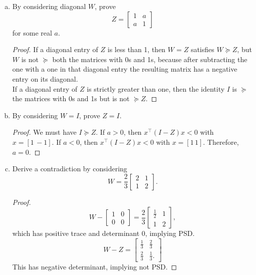\documentclass[../borwein-lewis_notes.tex]{subfiles}
\begin{document}
\begin{enumerate}[(a)]
\item By considering diagonal $W$, prove 
\begin{equation*}
Z = \begin{bmatrix} 1 & a \\ a & 1 \end{bmatrix}
\end{equation*}
for some real $a$. 
\begin{proof}
If a diagonal entry of $Z$ is less than 1, then $W = Z$ satisfies 
$W\succeq Z$, but $W$ is not $\succeq$ both the matrices with 0s and 
1s, because after subtracting the one with a one in that diagonal 
entry the resulting matrix has a negative entry on its diagonal. \\
If a diagonal entry of $Z$ is strictly greater than one, then the 
identity $I$ is $\succeq$ the matrices with 0s and 1s but is not 
$\succeq Z$.
\end{proof}
\item By considering $W=I$, prove $Z=I$.
\begin{proof}
We must have $I\succeq Z$. If $a>0$, then $x^\top (I- Z) x < 0$ with 
$x=[1\, -1]$. If $a<0$, then $x^\top (I-Z) x < 0$ with $x=[1\, 1]$.
Therefore, $a=0$.
\end{proof}
\item Derive a contradiction by considering 
\begin{equation*}
W = \frac{2}{3}\begin{bmatrix} 2&1\\1&2\end{bmatrix}.
\end{equation*}
\begin{proof}
\begin{equation*}
W - \begin{bmatrix} 1 & 0 \\ 0 & 0 \end{bmatrix}
= \frac{2}{3}\begin{bmatrix} \frac{1}{2} & 1 \\
1 & 2 \end{bmatrix},
\end{equation*}
which has positive trace and determinant 0, implying PSD.
\begin{equation*}
W-Z = \begin{bmatrix}
\frac{1}{3} & \frac{2}{3} \\
\frac{2}{3} & \frac{1}{3}.
\end{bmatrix}
\end{equation*}
This has negative determinant, implying not PSD.
\end{proof}
\end{enumerate}
\end{document}
